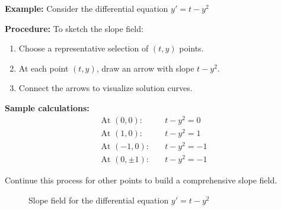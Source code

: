 \documentclass{article}
\begin{document}
\textbf{Example:} Consider the differential equation $y' = t - y^2$

\textbf{Procedure:} To sketch the slope field:
\begin{enumerate}
    \item Choose a representative selection of $(t, y)$ points.
    \item At each point $(t,y)$, draw an arrow with slope $t - y^2$.
    \item Connect the arrows to visualize solution curves.
\end{enumerate}

\textbf{Sample calculations:}
\begin{align*}
    \text{At } (0,0):& \quad t - y^2 = 0 \\
    \text{At } (1,0):& \quad t - y^2 = 1 \\
    \text{At } (-1,0):& \quad t - y^2 = -1 \\
    \text{At } (0,\pm 1):& \quad t - y^2 = -1
\end{align*}

Continue this process for other points to build a comprehensive slope field.

\begin{figure}[h]
    \centering
    \caption{Slope field for the differential equation $y' = t - y^2$}
    \label{fig:slope_field}
\end{figure}
\end{document}
